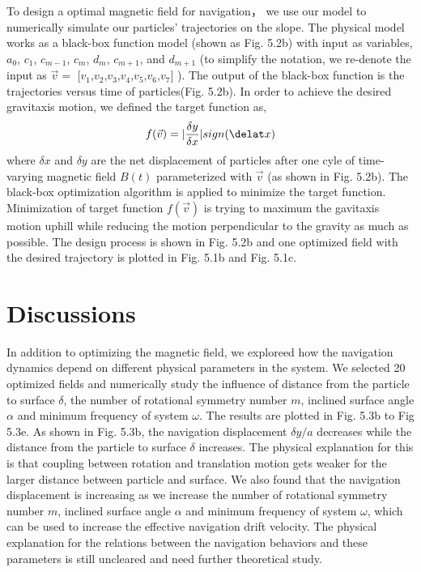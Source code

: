 To design a optimal magnetic field for navigation， we use our model to numerically simulate our particles' trajectories on the slope. The physical model works as a black-box function model (shown as Fig. 5.2b) with input as variables, $a_0$, $c_1$, $c_{m-1}$, $c_{m}$, $d_{m}$, $c_{m+1}$, and $d_{m+1}$ (to simplify the notation, we re-denote the input as $\vec{v}=$ $[v_1$,$v_2$,$v_3$,$v_4$,$v_5$,$v_6$,$v_7]$  ). The output of the black-box function is the trajectories versus time of particles(Fig. 5.2b). In order to achieve the desired gravitaxis motion, we defined the target function as,
\begin{equation}
    f(\vec{v})=|\frac{\delta y}{\delta x}| sign(\delat x)
\end{equation}
where $\delta x$ and $\delta y$ are the net displacement of particles after one cyle of  time-varying magnetic field $B(t)$ parameterized with $\vec{v}$ (as shown in Fig. 5.2b).
The black-box optimization algorithm is applied to minimize the target function\autocite{dou2019autonomous}. Minimization of target function $f(\vec{v})$ is trying to maximum the gavitaxis motion uphill while reducing the motion perpendicular to the gravity as much as possible. The design process is shown in Fig. 5.2b and one optimized field with the desired trajectory is plotted in Fig. 5.1b and Fig. 5.1c.


 
\section{Discussions}
In addition to optimizing the magnetic field, we exploreed how the navigation dynamics depend on different physical parameters in the system. We selected 20 optimized fields and numerically study the influence of distance from the particle to surface $\delta$, the number of  rotational symmetry number $m$, inclined surface angle $\alpha$ and  minimum frequency of system  $\omega$. The results are plotted in Fig. 5.3b to Fig 5.3e. As shown in Fig. 5.3b, the navigation displacement $\delta y/a$ decreases while the distance from the particle to surface $\delta$ increases. The physical explanation for this is that coupling between rotation and translation motion gets weaker for the larger distance between particle and surface. We also found that the navigation displacement is increasing as we increase the   number of  rotational symmetry number $m$, inclined surface angle $\alpha$ and  minimum frequency of system  $\omega$, which can be used to increase the effective navigation drift velocity. The physical explanation for the relations between the navigation behaviors and these parameters is still uncleared and need further theoretical study. 



